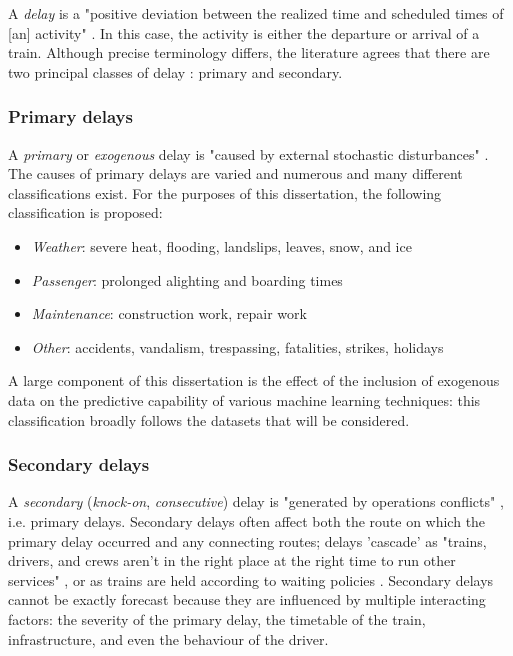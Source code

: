 \documentclass{article}
\begin{document}
A \textit{delay} is a "positive deviation between the realized time and scheduled times of [an] activity" \cite{cerreto_nielsen_harrod_nielsen_2016}. In this case, the activity is either the departure or arrival of a train.  Although precise terminology differs, the literature agrees that there are two principal classes of delay \cite{olsson_haugland_2004}: primary and secondary.

\subsubsection{Primary delays}

A \textit{primary} or \textit{exogenous} delay is "caused by external stochastic disturbances" \cite{oneto_et_al_2016}. The causes of primary delays are varied and numerous \cite{berger_et_al_2011}\cite{cerreto_nielsen_harrod_nielsen_2016}\cite{milinkovic_et_al_2013}\cite{nr_delay_causes} and many different classifications exist. For the purposes of this dissertation, the following classification is proposed:

\begin{itemize}
	\item \textit{Weather}: severe heat, flooding, landslips, leaves, snow, and ice
	\item \textit{Passenger}: prolonged alighting and boarding times
	\item \textit{Maintenance}: construction work, repair work
	\item \textit{Other}: accidents, vandalism, trespassing, fatalities, strikes, holidays
\end{itemize}

A large component of this dissertation is the effect of the inclusion of exogenous data on the predictive capability of various machine learning techniques: this classification broadly follows the datasets that will
be considered.

\subsubsection{Secondary delays}

A \textit{secondary} (\textit{knock-on}, \textit{consecutive}) delay is "generated by operations conflicts" \cite{cerreto_nielsen_harrod_nielsen_2016}, i.e. primary delays. Secondary delays often affect
both the route on which the primary delay occurred and any connecting routes; delays 'cascade' as "trains, drivers, and crews aren't in the right place at the right time to run other services" \cite{nr_knock_on_delays},
or as trains are held according to waiting policies \cite{berger_et_al_2011}. Secondary delays cannot be exactly forecast \cite{berger_et_al_2011}\cite{milinkovic_et_al_2013} because they are influenced by multiple interacting factors: the severity of the primary delay, the timetable of the train, infrastructure, and even the behaviour of the driver.
\end{document}
